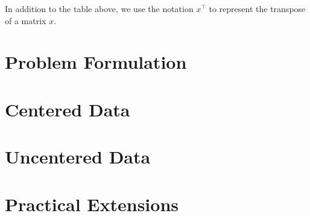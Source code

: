 \documentclass{article}
\begin{document}
In addition to the table above, we use the notation $x^\top$ to represent the transpose of a matrix $x$.

\section{Problem Formulation}
\label{sec:problem}


\section{Centered Data}
\label{sec:centered}


\section{Uncentered Data}
\label{sec:uncentered}


\section{Practical Extensions}
\label{sec:practical}


\newpage



\end{document}
